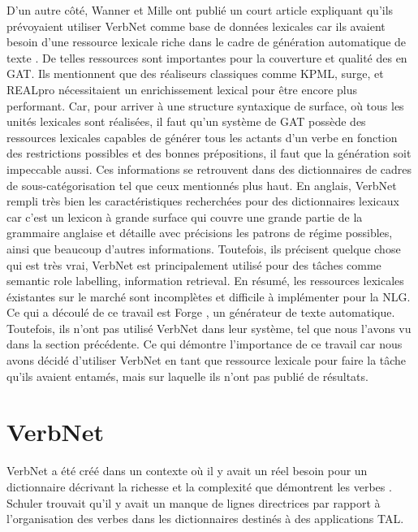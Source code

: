 D'un autre côté, Wanner et Mille ont publié un court article expliquant qu'ils prévoyaient utiliser VerbNet comme base de données lexicales car ils avaient besoin d'une ressource lexicale riche dans le cadre de génération automatique de texte \citep{MilleLargeCoverageDetailed2015}. De telles ressources sont importantes pour la couverture et qualité des en GAT. Ils mentionnent que des réaliseurs classiques comme KPML, surge, et REALpro  nécessitaient un enrichissement lexical pour être encore plus performant. Car, pour arriver à une structure syntaxique de surface, où tous les unités lexicales sont réalisées, il faut qu'un système de GAT possède des ressources lexicales capables de générer tous les actants d'un verbe en fonction des restrictions possibles et des bonnes prépositions, il faut que la génération soit impeccable aussi. Ces informations se retrouvent dans des dictionnaires de cadres de sous-catégorisation tel que ceux mentionnés plus haut. En anglais, VerbNet rempli très bien les caractéristiques recherchées pour des dictionnaires lexicaux car c'est un lexicon à grande surface qui couvre une grande partie de la grammaire anglaise et détaille avec précisions les patrons de régime possibles, ainsi que beaucoup d'autres informations. Toutefois, ils précisent quelque chose qui est très vrai, VerbNet est principalement utilisé pour des tâches comme semantic role labelling, information retrieval. En résumé, les ressources lexicales éxistantes sur le marché sont incomplètes et difficile à implémenter pour la NLG. Ce qui a découlé de ce travail est Forge \citep{DBLP:conf/semeval/MilleCBW17}, un générateur de texte automatique. Toutefois, ils n'ont pas utilisé VerbNet dans leur système, tel que nous l'avons vu dans la section précédente. Ce qui démontre l'importance de ce travail car nous avons décidé d'utiliser VerbNet en tant que ressource lexicale pour faire la tâche qu'ils avaient entamés, mais sur laquelle ils n'ont pas publié de résultats.


\section{VerbNet}

VerbNet a été créé dans un contexte où il y avait un réel besoin pour un dictionnaire décrivant la richesse et la complexité que démontrent les verbes \citep{KipperClassBasedConstructionVerb2000}. Schuler trouvait qu'il y avait un manque de lignes directrices par rapport à l'organisation des verbes dans les dictionnaires destinés à des applications \ac{TAL}. 

